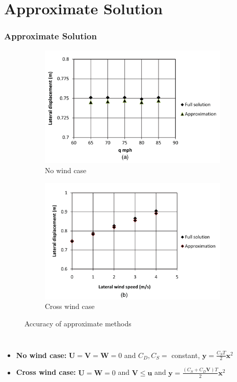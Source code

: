 \documentclass{beamer}
\renewcommand{\vec}[1]{\mathbf{#1}}
\begin{document}
\section{Approximate Solution}
\begin{frame}
\frametitle{Approximate Solution}

\begin{figure}[h!]
  \centering
  \begin{subfigure}[b]{0.4\linewidth}
    \includegraphics[width=\linewidth]{./figs/no_wind.png}
    \caption{No wind case}
  \end{subfigure}
  \begin{subfigure}[b]{0.4\linewidth}
    \includegraphics[width=\linewidth]{./figs/cross_wind.png}
    \caption{Cross wind case}
  \end{subfigure}
  \caption{Accuracy of approximate methods}
  \label{fig:Accuracy of approximate methods}
\end{figure}

\begin{columns}
  \begin{itemize}
  \item \textbf{No wind case:} $\vec{U}=\vec{V}=\vec{W}=0$ and $C_D, C_S =$ constant,
  $ \vec{y}=\frac{C_S T}{2} \vec{x}^2$
  \item \textbf{Cross wind case:} $\vec{U}=\vec{W}=0$ and $\vec{V}\leq\vec{u}$ and 
 $ \vec{y}=\frac{(C_S + C_D \vec{V}) T}{2} \vec{x}^2$
  
  \end{itemize}
\end{columns}
\end{frame}
\end{document}
